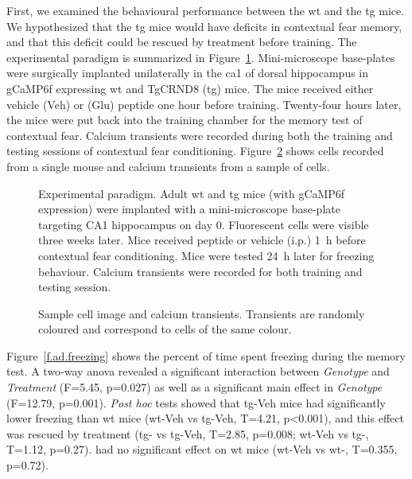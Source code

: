 First, we examined the behavioural performance between the \gls{wt} and the \gls{tg} mice. We hypothesized that the \gls{tg} mice would have deficits in contextual fear memory, and that this deficit could be rescued by \tglu{} treatment before training.  The experimental paradigm is summarized in Figure~\ref{f.ad.paradigm}. Mini-microscope base-plates were surgically implanted unilaterally in the \gls{ca1} of dorsal hippocampus in gCaMP6f expressing \gls{wt} and TgCRND8 (\gls{tg}) mice. The mice received either vehicle (Veh) or \tglu{} (Glu) peptide one hour before training. Twenty-four hours later, the mice were put back into the training chamber for the memory test of contextual fear. Calcium transients were recorded during both the training and testing sessions of contextual fear conditioning. Figure~\ref{f.ad.trace} shows cells recorded from a single mouse and calcium transients from a sample of cells.
\begin{figure}[h]
    
    \caption[Experimental paradigm for contextual fear conditioning.]{Experimental paradigm. Adult \gls{wt} and \gls{tg} mice (with gCaMP6f expression) were implanted with a mini-microscope base-plate targeting CA1 hippocampus on day 0. Fluorescent cells were visible three weeks later. Mice received \tglu{} peptide or vehicle (i.p.) \SI{1}{\hour} before contextual fear conditioning. Mice were tested \SI{24}{\hour} later for freezing behaviour. Calcium transients were recorded for both training and testing session. \label{f.ad.paradigm}}
\end{figure}

\begin{figure}[h]
    
    \caption[Sample cell image and calcium transients.]{Sample cell image and calcium transients. Transients are randomly coloured and correspond to cells of the same colour. \label{f.ad.trace}}
\end{figure}


Figure~\ref{f.ad.freezing} shows the percent of time spent freezing during the memory test. A two-way \gls{anova} revealed a significant interaction between \textit{Genotype} and \textit{Treatment} (F=5.45, p=0.027) as well as a significant main effect in \textit{Genotype} (F=12.79, p=0.001).  \textit{Post hoc} tests showed that \gls{tg}-Veh mice had significantly lower freezing than \gls{wt} mice (\gls{wt}-Veh vs \gls{tg}-Veh, T=4.21, p<0.001), and this effect was rescued by \tglu{} treatment (\gls{tg}-\glu{} vs \gls{tg}-Veh, T=2.85, p=0.008; \gls{wt}-Veh vs \gls{tg}-\glu, T=1.12, p=0.27). \tglu{} had no significant effect on \gls{wt} mice (\gls{wt}-Veh vs \gls{wt}-\glu, T=0.355, p=0.72). 

